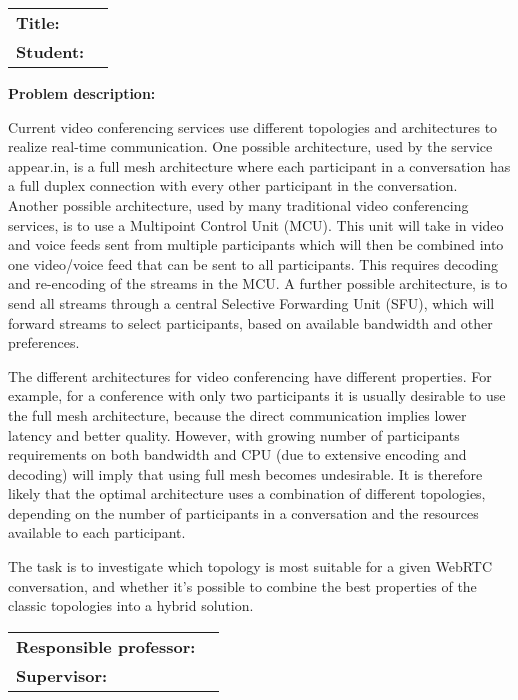 \begin{titlingpage}

\noindent
\begin{tabular}{@{}p{4cm}l}
\textbf{Title:} 	& \thetitle \\
\textbf{Student:}	& \theauthor \\
\end{tabular}

\vspace{4ex}
\noindent\textbf{Problem description:}
\vspace{2ex}

Current video conferencing services use different topologies and architectures to realize real-time communication. One possible architecture, used by the service appear.in, is a full mesh architecture where each participant in a conversation has a full duplex connection with every other participant in the conversation. Another possible architecture, used by many traditional video conferencing services, is to use a Multipoint Control Unit (MCU). This unit will take in video and voice feeds sent from multiple participants which will then be combined into one video/voice feed that can be sent to all participants. This requires decoding and re-encoding of the streams in the MCU. A further possible architecture, is to send all streams through a central Selective Forwarding Unit (SFU), which will forward streams to select participants, based on available bandwidth and other preferences.

The different architectures for video conferencing have different properties. For example, for a conference with only two participants it is usually desirable to use the full mesh architecture, because the direct communication implies lower latency and better quality. However, with growing number of participants requirements on both bandwidth and CPU (due to extensive encoding and decoding) will imply that using full mesh becomes undesirable.  It is therefore likely that the optimal architecture uses a combination of different topologies, depending on the number of participants in a conversation and the resources available to each participant.

The task is to investigate which topology is most suitable for a given WebRTC conversation, and whether it's possible to combine the best properties of the classic topologies into a hybrid solution.

\vspace{6ex}

\noindent
\begin{tabular}{@{}p{4cm}l}
\textbf{Responsible professor:} 	& \theprofessor \\
\textbf{Supervisor:}			& \thesupervisor \\
\end{tabular}

\end{titlingpage}
